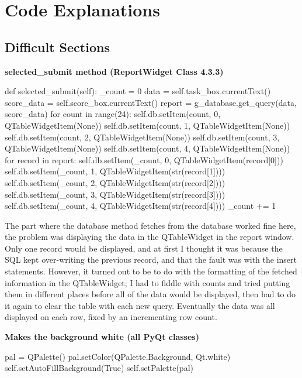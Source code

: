\section{Code Explanations}

\subsection{Difficult Sections}

\textbf{selected\_submit method (ReportWidget Class 4.3.3)}

\begin{python}
def selected_submit(self):
        _count = 0
        data = self.task_box.currentText()
        score_data = self.score_box.currentText()
        report = g_database.get_query(data, score_data)
        for count in range(24):
            self.db.setItem(count, 0, QTableWidgetItem(None))
            self.db.setItem(count, 1, QTableWidgetItem(None))
            self.db.setItem(count, 2, QTableWidgetItem(None))
            self.db.setItem(count, 3, QTableWidgetItem(None))
            self.db.setItem(count, 4, QTableWidgetItem(None))
        for record in report:
            self.db.setItem(_count, 0, QTableWidgetItem(record[0]))
            self.db.setItem(_count, 1, QTableWidgetItem(str(record[1])))
            self.db.setItem(_count, 2, QTableWidgetItem(str(record[2])))
            self.db.setItem(_count, 3, QTableWidgetItem(str(record[3])))
            self.db.setItem(_count, 4, QTableWidgetItem(str(record[4])))
            _count += 1
\end{python}

The part where the database method fetches from the database worked fine here, the problem was displaying the data in the QTableWidget in the report window. Only one record would be displayed, and at first I thought it was because the SQL kept over-writing the previous record, and that the fault was with the insert statements. However, it turned out to be to do with the formatting of the fetched information in the QTableWidget; I had to fiddle with counts and tried putting them in different places before all of the data would be displayed, then had to do it again to clear the table with each new query. Eventually the data was all displayed on each row, fixed by an incrementing row count. 

\textbf{Makes the background white (all PyQt classes)}

\begin{python}
pal = QPalette()
        pal.setColor(QPalette.Background, Qt.white)
        self.setAutoFillBackground(True)
        self.setPalette(pal)
\end{python}

